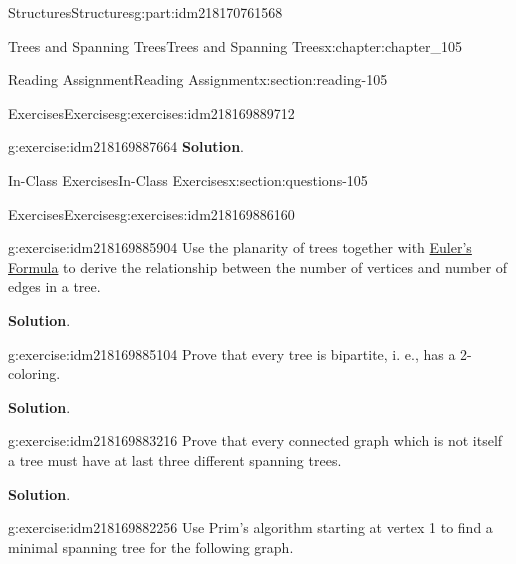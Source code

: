 \documentclass[oneside,10pt,]{book}
\newcommand{\blocktitlefont}{\relax}
\numberwithin{equation}{section}
\begin{document}
\begin{partptx}{Structures}{}{Structures}{}{}{g:part:idm218170761568}
\begin{chapterptx}{Trees and Spanning Trees}{}{Trees and Spanning Trees}{}{}{x:chapter:chapter_105}
\begin{sectionptx}{Reading Assignment}{}{Reading Assignment}{}{}{x:section:reading-105}
\begin{exercises-subsection-numberless}{Exercises}{}{Exercises}{}{}{g:exercises:idm218169889712}
\begin{exercisegroup}
\begin{divisionexerciseeg}{2}{}{}{g:exercise:idm218169887664}
\noindent\textbf{\blocktitlefont Solution}.\hypertarget{g:solution:idm218169887152}{}\quad{}%
\end{divisionexerciseeg}%
\end{exercisegroup}
\par\medskip\noindent
\end{exercises-subsection-numberless}
\end{sectionptx}
%
%
\typeout{************************************************}
\typeout{************************************************}
%
\begin{sectionptx}{In-Class Exercises}{}{In-Class Exercises}{}{}{x:section:questions-105}
%
%
%
\typeout{************************************************}
\typeout{************************************************}
%
\begin{exercises-subsection-numberless}{Exercises}{}{Exercises}{}{}{g:exercises:idm218169886160}
\par\medskip\noindent%
%
\begin{exercisegroup}
\begin{divisionexerciseeg}{1}{}{}{g:exercise:idm218169885904}%
Use the planarity of trees together with \hyperref[x:theorem:theorem-euler-formula-statement]{Euler's Formula} to derive the relationship between the number of vertices and number of edges in a tree.%
\par\smallskip%
\noindent\textbf{\blocktitlefont Solution}.\hypertarget{g:solution:idm218169884288}{}\quad{}%
\end{divisionexerciseeg}%
\begin{divisionexerciseeg}{2}{}{}{g:exercise:idm218169885104}%
Prove that every tree is bipartite, i. e., has a 2-coloring.%
\par\smallskip%
\noindent\textbf{\blocktitlefont Solution}.\hypertarget{g:solution:idm218169883472}{}\quad{}%
\end{divisionexerciseeg}%
\begin{divisionexerciseeg}{3}{}{}{g:exercise:idm218169883216}%
Prove that every connected graph which is not itself a tree must have at last three different spanning trees.%
\par\smallskip%
\noindent\textbf{\blocktitlefont Solution}.\hypertarget{g:solution:idm218169882512}{}\quad{}%
\end{divisionexerciseeg}%
\begin{divisionexerciseeg}{4}{}{}{g:exercise:idm218169882256}%
Use Prim's algorithm starting at vertex 1 to find a minimal spanning tree for the following graph.%

\end{divisionexerciseeg}
\end{exercisegroup}
\end{exercises-subsection-numberless}
\end{sectionptx}
\end{chapterptx}
\end{partptx}
\end{document}
